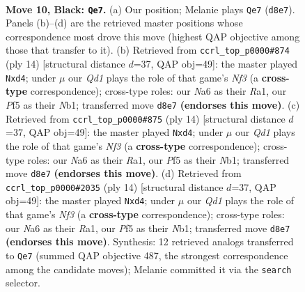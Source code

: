 \documentclass[11pt]{article}
\begin{document}
\clearpage

\begin{figure}[p]\centering
\begin{subfigure}{0.46\textwidth}\centering
\resizebox{\linewidth}{!}{%
\newchessgame
\chessboard[
  setfen={r1bq1rk1/pp4pp/n1pb1n2/P2p1p2/3P3P/5NP1/1P2PPB1/RNBQ1RK1 b - - 0 10},
  showmover=false,
  pgfstyle=straightmove, color=movearrow, markmove={d8-e7}
]}
\caption{}
\end{subfigure}\hfill
\begin{subfigure}{0.46\textwidth}\centering
\resizebox{\linewidth}{!}{%
\newchessgame
\chessboard[
  setfen={rnbq1rk1/pp2ppbp/5np1/3P4/3p4/5NP1/PP2PPBP/RNBQ1RK1 w - - 0 8},
  showmover=false,
  pgfstyle=straightmove, color=movearrow, markmove={f3-d4}
]}
\caption{}
\end{subfigure}
\\[4pt]
\begin{subfigure}{0.46\textwidth}\centering
\resizebox{\linewidth}{!}{%
\newchessgame
\chessboard[
  setfen={rnbq1rk1/pp2ppbp/5np1/3P4/3p4/5NP1/PP2PPBP/RNBQ1RK1 w - - 0 8},
  showmover=false,
  pgfstyle=straightmove, color=movearrow, markmove={f3-d4}
]}
\caption{}
\end{subfigure}\hfill
\begin{subfigure}{0.46\textwidth}\centering
\resizebox{\linewidth}{!}{%
\newchessgame
\chessboard[
  setfen={rnbq1rk1/pp2ppbp/5np1/3P4/3p4/5NP1/PP2PPBP/RNBQ1RK1 w - - 0 8},
  showmover=false,
  pgfstyle=straightmove, color=movearrow, markmove={f3-d4}
]}
\caption{}
\end{subfigure}
\caption{\textbf{Move 10, Black: \texttt{Qe7}.} (a) Our position; Melanie plays \texttt{Qe7} (\texttt{d8e7}). Panels (b)--(d) are the retrieved master positions whose correspondence most drove this move (highest QAP objective among those that transfer to it). (b) Retrieved from \texttt{ccrl\_top\_p0000\#874} (ply 14) [structural distance $d$=37, QAP obj=49]: the master played \texttt{Nxd4}; under $\mu$ our \emph{Qd1} plays the role of that game's \emph{Nf3} (a \textbf{cross-type} correspondence); cross-type roles: our \emph{N}a6 as their \emph{R}a1, our \emph{P}f5 as their \emph{N}b1; transferred move \texttt{d8e7} \textbf{(endorses this move)}. (c) Retrieved from \texttt{ccrl\_top\_p0000\#875} (ply 14) [structural distance $d$=37, QAP obj=49]: the master played \texttt{Nxd4}; under $\mu$ our \emph{Qd1} plays the role of that game's \emph{Nf3} (a \textbf{cross-type} correspondence); cross-type roles: our \emph{N}a6 as their \emph{R}a1, our \emph{P}f5 as their \emph{N}b1; transferred move \texttt{d8e7} \textbf{(endorses this move)}. (d) Retrieved from \texttt{ccrl\_top\_p0000\#2035} (ply 14) [structural distance $d$=37, QAP obj=49]: the master played \texttt{Nxd4}; under $\mu$ our \emph{Qd1} plays the role of that game's \emph{Nf3} (a \textbf{cross-type} correspondence); cross-type roles: our \emph{N}a6 as their \emph{R}a1, our \emph{P}f5 as their \emph{N}b1; transferred move \texttt{d8e7} \textbf{(endorses this move)}. Synthesis: 12 retrieved analogs transferred to \texttt{Qe7} (summed QAP objective 487, the strongest correspondence among the candidate moves); Melanie committed it via the \texttt{search} selector.}
\label{fig:thought-m19}
\end{figure}
\end{document}
